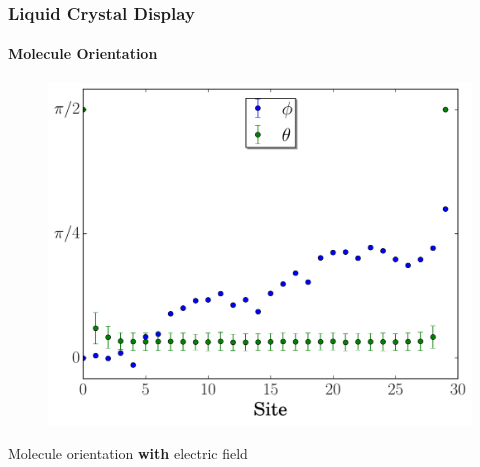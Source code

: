 \documentclass{beamer}
\begin{document}
\begin{frame}
	\frametitle{Liquid Crystal Display}
	\framesubtitle{Molecule Orientation}
    \begin{figure}[h!]
    \includegraphics[scale=0.48]{figures/lcd_etteind.pdf}
    \end{figure}
\vspace{-0.6cm}
    
\center
Molecule orientation \textbf{with} electric field
\end{frame}
\end{document}
